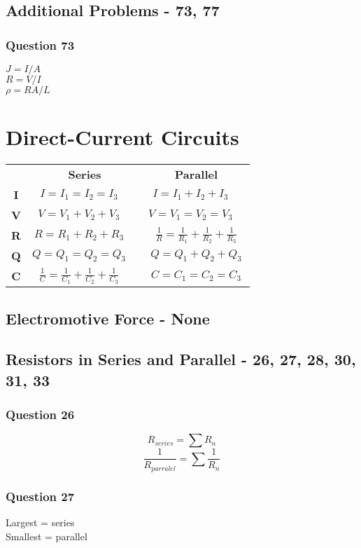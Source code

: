\documentclass[12pt, letterpaper, twoside]{article}
\begin{document}
  \subsection*{Additional Problems - 73, 77}
    \subsubsection*{Question 73}
      $J = I/A$\\
      $R = V/I$\\
      $\rho = RA/L$
      
\section{Direct-Current Circuits} 
  \begin{tabular}{c c c}
  	   & \textbf{Series} & \textbf{Parallel}\\
      \textbf{I} \quad & $I = I_1 = I_2 = I_3 \quad$ & $I = I_1 + I_2 + I_3 \quad$\\
      \textbf{V} \quad & $V = V_1 + V_2 + V_3 \quad$ & $V = V_1 = V_2 = V_3 \quad$\\
      \textbf{R} \quad & $R = R_1 + R_2 + R_3 \quad$ & $\frac{1}{R} = \frac{1}{R_1} + \frac{1}{R_2} + \frac{1}{R_3}$\\
      \textbf{Q} \quad & $Q = Q_1 = Q_2 = Q_3 \quad$ & $Q = Q_1 + Q_2 + Q_3$\\
      \textbf{C} \quad & $\frac{1}{C} = \frac{1}{C_1} + \frac{1}{C_2} + \frac{1}{C_3} \quad$ & $C = C_1 = C_2 = C_3$\\
    \end{tabular}
  \subsection{Electromotive Force - None}
  \subsection{Resistors in Series and Parallel - 26, 27, 28, 30, 31, 33}
  	\subsubsection*{Question 26}
  	  $$R_{series} = \sum R_n$$
  	  $$\frac{1}{R_{parralel}} = \sum \frac{1}{R_n}$$
  	\subsubsection*{Question 27}
  	  Largest = series\\
  	  Smallest = parallel
\end{document}
